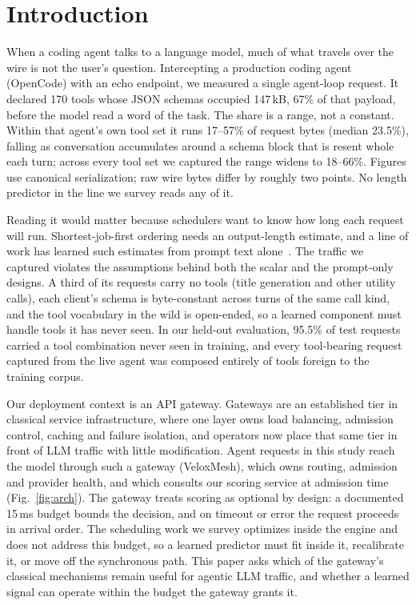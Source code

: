 \section{Introduction}

When a coding agent talks to a language model, much of what travels
over the wire is not the user's question. Intercepting a production coding
agent (OpenCode) with an echo endpoint, we measured a single agent-loop
request. It declared 170 tools whose JSON schemas occupied 147\,kB, 67\% of
that payload, before the model read a word of the task. The share is a
range, not a constant. Within that agent's own tool set it runs 17--57\%
of request bytes (median 23.5\%), falling as conversation accumulates
around a schema block that is resent whole each turn; across every tool set
we captured the range widens to 18--66\%. Figures use
canonical serialization; raw wire bytes differ by roughly two points. No length predictor in the line we survey reads any of it.

Reading it would matter because schedulers want to know how long
each request will run. Shortest-job-first ordering needs an output-length
estimate, and a line of work has learned such estimates from prompt text
alone~\cite{fuLTR2024,tao2026ranking}. The traffic we captured violates the assumptions
behind both the scalar and the prompt-only designs. A third of its requests
carry no tools (title generation and other utility calls), each client's
schema is byte-constant across turns of the same call kind, and the tool
vocabulary in the wild is open-ended, so a learned component must handle
tools it has never seen. In our held-out
evaluation, 95.5\% of test requests carried a tool combination never seen in
training, and every tool-bearing request captured from the live agent was
composed entirely of tools foreign to the training corpus.

Our deployment context is an API gateway. Gateways are an established tier
in classical service infrastructure, where one layer owns load balancing,
admission control, caching and failure isolation, and operators now place
that same tier in front of LLM traffic with little modification. Agent
requests in this study reach the model through such a gateway (VeloxMesh),
which owns routing, admission and provider health, and which consults our
scoring service at admission time (Fig.~\ref{fig:arch}). The gateway treats
scoring as optional by design: a documented 15\,ms budget bounds the
decision, and on timeout or error the request proceeds in arrival order.
The scheduling work we survey optimizes inside the engine and does not
address this budget, so a learned predictor must fit inside it, recalibrate
it, or move off the synchronous path. This paper asks which of the gateway's
classical mechanisms remain useful for agentic LLM traffic, and whether a
learned signal can operate within the budget the gateway grants it.

